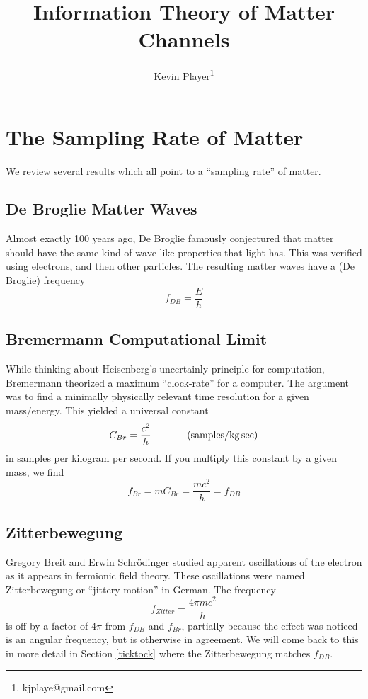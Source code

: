 \documentclass[12pt,a4paper]{article}
\begin{document}
\title{Information Theory of Matter Channels}
\author[1]{Kevin Player\footnote{kjplaye@gmail.com}}

\maketitle


\section{The Sampling Rate of Matter}
\label{rate}
We review several results which all point to a ``sampling rate'' of matter.
\subsection{De Broglie Matter Waves}
Almost exactly 100 years ago, De Broglie famously conjectured that matter should have the same kind of wave-like properties that light has.  This was verified using electrons, and then other particles.  The resulting matter waves have a (De Broglie) frequency
\[
  f_{DB} = \frac{E}{h}
\]

\subsection{Bremermann Computational Limit}
While thinking about Heisenberg's uncertainly principle for computation, Bremermann theorized a maximum ``clock-rate'' for a computer.  The argument was to find a minimally physically relevant time resolution for a given mass/energy.  This yielded a universal constant
\[
  C_{Br} = \frac{c^2}{h} \hspace{0.5 in} (\si[per-mode=symbol]{samples\per\kilogram.\sec})
\]
in samples per kilogram per second.  If you multiply this constant by a given mass, we find
\[
 f_{Br} = m C_{Br} = \frac{mc^2}{h} = f_{DB}
\]

\subsection{Zitterbewegung}
Gregory Breit and Erwin Schrödinger studied apparent oscillations of the electron as it appears in fermionic field theory.  These oscillations were named Zitterbewegung or ``jittery motion'' in German.  The frequency 
\[
 f_{Zitter} = \frac{4 \pi mc^2}{h}
 \]
is off by a factor of $4 \pi$ from $f_{DB}$ and $f_{Br}$, partially because the effect was noticed is an angular frequency, but is otherwise in agreement.  We will come back to this in more detail in Section \ref{ticktock} where the Zitterbewegung matches $f_{DB}$.
\end{document}
